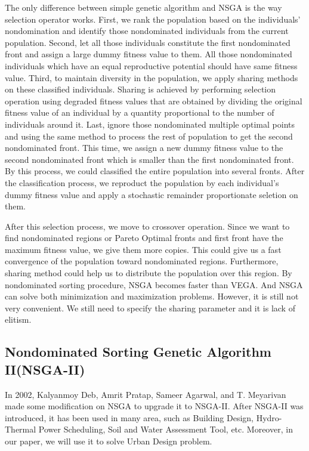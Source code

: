 The only difference between simple genetic algorithm and NSGA is the way selection operator works. First, we rank the population based on the individuals' nondomination and identify those nondominated individuals from the current population. Second, let all those individuals constitute the first nondominated front and assign a large dummy fitness value to them. All those nondominated individuals which have an equal reproductive potential should have same fitness value. Third, to maintain diversity in the population, we apply sharing methods\cite{Deb_1989_Investigation}\cite{Deb_1989_Genetic} on these classified individuals. Sharing is achieved by performing selection operation using degraded fitness values that are obtained by dividing the original fitness value of an individual by a quantity proportional to the number of individuals around it. Last, ignore those nondominated multiple optimal points and using the same method to process the rest of population to get the second nondominated front. This time, we assign a new dummy fitness value to the second nondominated front which is smaller than the first nondominated front. By this process, we could classified the entire population into several fronts. After the classification process, we reproduct the population by each individual's dummy fitness value and apply a stochastic remainder proportionate seletion on them.

After this selection process, we move to crossover operation. Since we want to find nondominated regions or Pareto Optimal fronts and first front have the maximum fitness value, we give them more copies. This could give us a fast convergence of the population toward nondominated regions. Furthermore, sharing method could help us to distribute the population over this region. By nondominated sorting procedure, NSGA becomes faster than VEGA. And NSGA can solve both minimization and maximization problems. However, it is still not very convenient. We still need to specify the sharing parameter and it is lack of elitism.

\subsection{Nondominated Sorting Genetic Algorithm II(NSGA-II)}
In 2002, Kalyanmoy Deb, Amrit Pratap, Sameer Agarwal, and T. Meyarivan made some modification on NSGA to upgrade it to NSGA-II\cite{NSGA_II}. After NSGA-II was introduced, it has been used in many area, such as Building Design\cite{Magnier_2010_Multiobjective}, Hydro-Thermal Power Scheduling\cite{Deb_2007_Dynamic}, Soil and Water Assessment Tool\cite{Bekele_2007_Multi}, etc. Moreover, in our paper, we will use it to solve Urban Design problem. 

